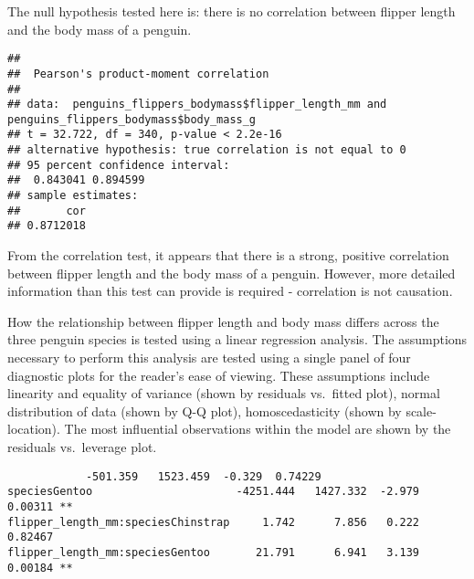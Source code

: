 \documentclass[
]{article}
\newenvironment{Shaded}{\begin{snugshade}}{\end{snugshade}}
\newcommand{\AttributeTok}[1]{\textcolor[rgb]{0.13,0.29,0.53}{#1}}
\newcommand{\CommentTok}[1]{\textcolor[rgb]{0.56,0.35,0.01}{\textit{#1}}}
\newcommand{\FunctionTok}[1]{\textcolor[rgb]{0.13,0.29,0.53}{\textbf{#1}}}
\newcommand{\NormalTok}[1]{#1}
\newcommand{\SpecialCharTok}[1]{\textcolor[rgb]{0.81,0.36,0.00}{\textbf{#1}}}
\newcommand{\StringTok}[1]{\textcolor[rgb]{0.31,0.60,0.02}{#1}}
\begin{document}
The null hypothesis tested here is: there is no correlation between
flipper length and the body mass of a penguin.

\begin{Shaded}
\end{Shaded}

\begin{verbatim}
## 
##  Pearson's product-moment correlation
## 
## data:  penguins_flippers_bodymass$flipper_length_mm and penguins_flippers_bodymass$body_mass_g
## t = 32.722, df = 340, p-value < 2.2e-16
## alternative hypothesis: true correlation is not equal to 0
## 95 percent confidence interval:
##  0.843041 0.894599
## sample estimates:
##       cor 
## 0.8712018
\end{verbatim}

From the correlation test, it appears that there is a strong, positive
correlation between flipper length and the body mass of a penguin.
However, more detailed information than this test can provide is
required - correlation is not causation.

How the relationship between flipper length and body mass differs across
the three penguin species is tested using a linear regression analysis.
The assumptions necessary to perform this analysis are tested using a
single panel of four diagnostic plots for the reader's ease of viewing.
These assumptions include linearity and equality of variance (shown by
residuals vs.~fitted plot), normal distribution of data (shown by Q-Q
plot), homoscedasticity (shown by scale-location). The most influential
observations within the model are shown by the residuals vs.~leverage
plot.

\begin{verbatim}
            -501.359   1523.459  -0.329  0.74229    
speciesGentoo                      -4251.444   1427.332  -2.979  0.00311 ** 
flipper_length_mm:speciesChinstrap     1.742      7.856   0.222  0.82467    
flipper_length_mm:speciesGentoo       21.791      6.941   3.139  0.00184 ** 
\end{verbatim}
\end{document}
